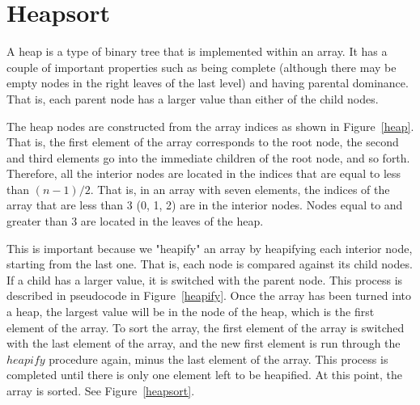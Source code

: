 \documentclass{article}
\begin{document}
\section{Heapsort}
A heap is a type of binary tree that is implemented within an array. It has a couple of important
properties such as being complete (although there may be empty nodes in the right leaves of the
last level) and having parental dominance. That is, each parent node has a larger value than either of the child nodes. 

The heap nodes are constructed from the array indices as shown in Figure~\ref{heap}. That is,
the first element of the array corresponds to the root node, the second and third elements go
into the immediate children of the root node, and so forth. Therefore, all the interior nodes
are located in the indices that are equal to less than $(n-1)/2$. That is, in an array with seven
elements, the indices of the array that are less than 3 (0, 1, 2) are in the interior nodes. Nodes
equal to and greater than 3 are located in the leaves of the heap.

This is important because we "heapify" an array by heapifying each interior node, starting from the
last one. That is, each node is compared against its child nodes. If a child has a larger value,
it is switched with the parent node. This process is described in pseudocode in Figure~\ref{heapify}.
Once the array has been turned into a heap, the largest value will be in the node of the heap, which
is the first element of the array. To sort the array, the first element of the array is switched with the
last element of the array, and the new first element is run through the $heapify$ procedure
again, minus the last element of the array. This process is completed until there is only one
element left to be heapified. At this point, the array is sorted. See Figure~\ref{heapsort}.
\end{document}
